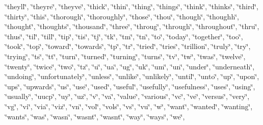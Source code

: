 \char`\"{}theyll\char`\"{}, \char`\"{}theyre\char`\"{}, \char`\"{}theyve\char`\"{}, \char`\"{}thick\char`\"{}, \char`\"{}thin\char`\"{}, \char`\"{}thing\char`\"{}, \char`\"{}things\char`\"{}, \char`\"{}think\char`\"{}, \char`\"{}thinks\char`\"{}, \char`\"{}third\char`\"{}, \char`\"{}thirty\char`\"{}, \char`\"{}this\char`\"{}, \char`\"{}thorough\char`\"{}, \char`\"{}thoroughly\char`\"{}, \char`\"{}those\char`\"{}, \char`\"{}thou\char`\"{}, \char`\"{}though\char`\"{}, \char`\"{}thoughh\char`\"{}, \char`\"{}thought\char`\"{}, \char`\"{}thoughts\char`\"{}, \char`\"{}thousand\char`\"{}, \char`\"{}three\char`\"{}, \char`\"{}throug\char`\"{}, \char`\"{}through\char`\"{}, \char`\"{}throughout\char`\"{}, \char`\"{}thru\char`\"{}, \char`\"{}thus\char`\"{}, \char`\"{}til\char`\"{}, \char`\"{}till\char`\"{}, \char`\"{}tip\char`\"{}, \char`\"{}tis\char`\"{}, \char`\"{}tj\char`\"{}, \char`\"{}tk\char`\"{}, \char`\"{}tm\char`\"{}, \char`\"{}tn\char`\"{}, \char`\"{}to\char`\"{}, \char`\"{}today\char`\"{}, \char`\"{}together\char`\"{}, \char`\"{}too\char`\"{}, \char`\"{}took\char`\"{}, \char`\"{}top\char`\"{}, \char`\"{}toward\char`\"{}, \char`\"{}towards\char`\"{}, \char`\"{}tp\char`\"{}, \char`\"{}tr\char`\"{}, \char`\"{}tried\char`\"{}, \char`\"{}tries\char`\"{}, \char`\"{}trillion\char`\"{}, \char`\"{}truly\char`\"{}, \char`\"{}try\char`\"{}, \char`\"{}trying\char`\"{}, \char`\"{}ts\char`\"{}, \char`\"{}tt\char`\"{}, \char`\"{}turn\char`\"{}, \char`\"{}turned\char`\"{}, \char`\"{}turning\char`\"{}, \char`\"{}turns\char`\"{}, \char`\"{}tv\char`\"{}, \char`\"{}tw\char`\"{}, \char`\"{}twas\char`\"{}, \char`\"{}twelve\char`\"{}, \char`\"{}twenty\char`\"{}, \char`\"{}twice\char`\"{}, \char`\"{}two\char`\"{}, \char`\"{}tz\char`\"{}, \char`\"{}u\char`\"{}, \char`\"{}ua\char`\"{}, \char`\"{}ug\char`\"{}, \char`\"{}uk\char`\"{}, \char`\"{}um\char`\"{}, \char`\"{}un\char`\"{}, \char`\"{}under\char`\"{}, \char`\"{}underneath\char`\"{}, \char`\"{}undoing\char`\"{}, \char`\"{}unfortunately\char`\"{}, \char`\"{}unless\char`\"{}, \char`\"{}unlike\char`\"{}, \char`\"{}unlikely\char`\"{}, \char`\"{}until\char`\"{}, \char`\"{}unto\char`\"{}, \char`\"{}up\char`\"{}, \char`\"{}upon\char`\"{}, \char`\"{}ups\char`\"{}, \char`\"{}upwards\char`\"{}, \char`\"{}us\char`\"{}, \char`\"{}use\char`\"{}, \char`\"{}used\char`\"{}, \char`\"{}useful\char`\"{}, \char`\"{}usefully\char`\"{}, \char`\"{}usefulness\char`\"{}, \char`\"{}uses\char`\"{}, \char`\"{}using\char`\"{}, \char`\"{}usually\char`\"{}, \char`\"{}uucp\char`\"{}, \char`\"{}uy\char`\"{}, \char`\"{}uz\char`\"{}, \char`\"{}v\char`\"{}, \char`\"{}va\char`\"{}, \char`\"{}value\char`\"{}, \char`\"{}various\char`\"{}, \char`\"{}vc\char`\"{}, \char`\"{}ve\char`\"{}, \char`\"{}versus\char`\"{}, \char`\"{}very\char`\"{}, \char`\"{}vg\char`\"{}, \char`\"{}vi\char`\"{}, \char`\"{}via\char`\"{}, \char`\"{}viz\char`\"{}, \char`\"{}vn\char`\"{}, \char`\"{}vol\char`\"{}, \char`\"{}vols\char`\"{}, \char`\"{}vs\char`\"{}, \char`\"{}vu\char`\"{}, \char`\"{}w\char`\"{}, \char`\"{}want\char`\"{}, \char`\"{}wanted\char`\"{}, \char`\"{}wanting\char`\"{}, \char`\"{}wants\char`\"{}, \char`\"{}was\char`\"{}, \char`\"{}wasn\char`\"{}, \char`\"{}wasn\textquotesingle{}t\char`\"{}, \char`\"{}wasnt\char`\"{}, \char`\"{}way\char`\"{}, \char`\"{}ways\char`\"{}, \char`\"{}we\char`\"{}, 